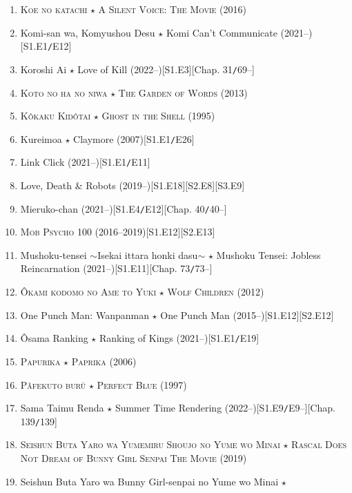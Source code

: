 \documentclass[oneside]{book}
\numberwithin{equation}{section}
\begin{document}
\begin{enumerate}
    \item \textsc{Koe no katachi $\star$ A Silent Voice: The Movie} (2016)
    \item Komi-san wa, Komyushou Desu $\star$ Komi Can't Communicate (2021--)\hfill[S1.E1\texttt{/}E12]
    \item Koroshi Ai $\star$ Love of Kill (2022--)\hfill[S1.E3][Chap. 31\texttt{/}69--]
    \item \textsc{Koto no ha no niwa $\star$ The Garden of Words} (2013)
    \item \textsc{K\^okaku Kid\^otai $\star$ Ghost in the Shell} (1995)
    \item Kureimoa $\star$ Claymore (2007)\hfill[S1.E1\texttt{/}E26]
    \item Link Click (2021--)\hfill[S1.E1\texttt{/}E11]
    \item Love, Death \& Robots (2019--)\hfill[S1.E18][S2.E8][S3.E9]
    \item Mieruko-chan (2021--)\hfill[S1.E4\texttt{/}E12][Chap. 40\texttt{/}40--]
    \item \textsc{Mob Psycho 100} (2016--2019)\hfill[S1.E12][S2.E13]
    \item Mushoku-tensei $\sim$Isekai ittara honki dasu$\sim$ $\star$ Mushoku Tensei: Jobless Reincarnation (2021--)\hfill[S1.E11][Chap. 73\texttt{/}73--]
    \item \textsc{\^Okami kodomo no Ame to Yuki $\star$ Wolf Children} (2012)
    \item One Punch Man: Wanpanman $\star$ One Punch Man (2015--)\hfill[S1.E12][S2.E12]
    \item Ôsama Ranking $\star$ Ranking of Kings (2021--)\hfill[S1.E1\texttt{/}E19]
    \item \textsc{Papurika $\star$ Paprika} (2006)
    \item \textsc{Pâfekuto burû $\star$ Perfect Blue} (1997)
    \item Sama Taimu Renda $\star$ Summer Time Rendering (2022--)\hfill[S1.E9\texttt{/}E9--][Chap. 139\texttt{/}139]
    \item \textsc{Seishun Buta Yaro wa Yumemiru Shoujo no Yume wo Minai $\star$ Rascal Does Not Dream of Bunny Girl Senpai The Movie} (2019)
    \item Seishun Buta Yaro wa Bunny Girl-senpai no Yume wo Minai $\star$
    

\end{enumerate}
\end{document}
